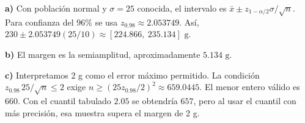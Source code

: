 \textbf{a)} Con población normal y $\sigma=25$ conocida,
el intervalo es $\bar x\pm z_{1-\alpha/2}\sigma/\sqrt n$.
Para confianza del $96\%$ se usa $z_{0.98}\approx2.053749$.
Así, $230\pm2.053749(25/10)\approx\boxed{[224.866,\ 235.134]\text{ g}}$.

\textbf{b)} El margen es la semiamplitud, aproximadamente
$\boxed{5.134\text{ g}}$.

\textbf{c)} Interpretamos 2 g como el error máximo permitido.
La condición $z_{0.98}\,25/\sqrt n\le2$ exige
$n\ge(25z_{0.98}/2)^2\approx659.0445$. El menor entero válido
es $\boxed{660}$. Con el cuantil tabulado $2.05$ se obtendría
$657$, pero al usar el cuantil con más precisión, esa muestra
supera el margen de 2 g.
